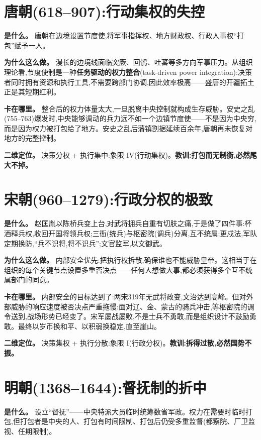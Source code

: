 \documentclass[UTF8,12pt,a4paper]{ctexrep}
\begin{document}
\section{唐朝(618--907):行动集权的失控}

\textbf{是什么。} 唐朝在边境设置节度使,将军事指挥权、地方财政权、行政人事权``打包''赋予一人。

\textbf{为什么这么做。} 漫长的边境线面临突厥、回鹘、吐蕃等多方向军事压力。从组织理论看,节度使制是一种\textbf{任务驱动的权力整合}(task-driven power integration):决策者同时拥有资源和执行工具,不需要跨部门协调,因此效率极高——盛唐的开疆拓土正是其短期红利。

\textbf{卡在哪里。} 整合后的权力体量太大,一旦脱离中央控制就构成生存威胁。安史之乱(755--763)爆发时,中央能够调动的兵力远不如一个边镇节度使——不是因为中央穷,而是因为权力被打包给了地方。安史之乱后藩镇割据延续百余年,唐朝再未恢复对地方的完整控制。

\textbf{二维定位。} 决策分权 + 执行集中:象限 IV(行动集权)。\textbf{教训:打包而无制衡,必然尾大不掉。}

\section{宋朝(960--1279):行政分权的极致}

\textbf{是什么。} 赵匡胤以陈桥兵变上台,对武将拥兵自重有切肤之痛,于是做了四件事:杯酒释兵权,收回开国将领兵权;三衙(统兵)与枢密院(调兵)分离,互不统属;更戍法,军队定期换防,``兵不识将,将不识兵'';文官监军,以文御武。

\textbf{为什么这么做。} 内部安全优先:把执行权拆散,确保谁也不能威胁皇帝。这相当于在组织的每个关键节点设置多重否决点——任何人想做大事,都必须获得多个互不统属部门的同意。

\textbf{卡在哪里。} 内部安全的目标达到了:两宋319年无武将政变,文治达到高峰。但对外部威胁的响应速度被否决点严重拖慢:面对辽、金、蒙古的骑兵冲击,等枢密院的调令送到,战场形势已经变了。宋军屡战屡败,不是士兵不勇敢,而是组织设计不鼓励勇敢。最终以岁币换和平、以积弱换稳定,直至崖山。

\textbf{二维定位。} 决策集权 + 执行分散:象限 I(行政分权)。\textbf{教训:拆得过散,必然国势不振。}

\section{明朝(1368--1644):督抚制的折中}

\textbf{是什么。} 设立``督抚''——中央特派大员临时统筹数省军政。权力在需要时临时打包,但打包者是中央的人、打包有时间限制、打包后仍受多重监督(都察院、厂卫监视、任期限制)。
\end{document}
